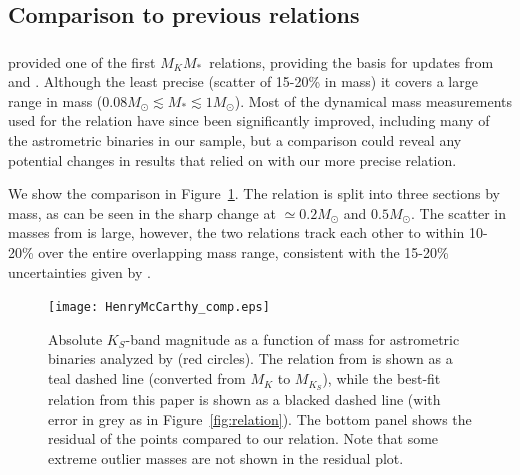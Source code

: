 \documentclass[twocolumn]{aastex62}
\newcommand{\mmkc}{$M_{K}$\textendash$M_*$}
\begin{document}
\subsection{Comparison to previous relations}\label{sec:other}

\subsubsection{\citet{Hen1993}}

\citet{Hen1993} provided one of the first \mmkc\ relations, providing the basis for updates from \citet{Delfosse2000} and \citet{Benedict2016}. Although the least precise (scatter of 15-20\% in mass) it covers a large range in mass ($0.08M_\odot \lesssim M_* \lesssim 1M_\odot$). Most of the dynamical mass measurements used for the \citet{Hen1993} relation have since been significantly improved, including many of the astrometric binaries in our sample, but a comparison could reveal any potential changes in results that relied on \citet{Hen1993} with our more precise relation.

We show the comparison in Figure~\ref{fig:henry}. The \citet{Hen1993} relation is split into three sections by mass, as can be seen in the sharp change at $\simeq0.2M_\odot$ and $0.5M_\odot$. The scatter in masses from \citet{Hen1993} is large, however, the two relations track each other to within 10-20\% over the entire overlapping mass range, consistent with the 15-20\% uncertainties given by \citet{Hen1993}.

\begin{figure}[htb]
\begin{center}
\texttt{[image: HenryMcCarthy\_comp.eps]}
\caption{Absolute $K_S$-band magnitude as a function of mass for astrometric binaries analyzed by \citet{Hen1993} (red circles). The relation from \citet{Hen1993} is shown as a teal dashed line (converted from $M_K$ to $M_{K_S}$), while the best-fit relation from this paper is shown as a blacked dashed line (with error in grey as in Figure~\ref{fig:relation}). The bottom panel shows the residual of the \citet{Hen1993} points compared to our relation. Note that some extreme outlier masses are not shown in the residual plot. }
\label{fig:henry}
\end{center}
\end{figure}

\subsubsection{\citet{Delfosse2000}}
\end{document}
